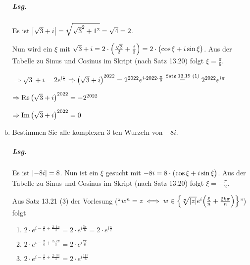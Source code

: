 \documentclass{scrreprt}
\begin{document}
\begin{enumerate}[(a)]
  \subparagraph{Lsg.} Es ist $\abs{\sqrt{3} + i} = \sqrt{\sqrt{3}^2 + 1^2}
  = \sqrt{4} = 2$.

  Nun wird ein $\xi$ mit
  $\sqrt{3} + i = 2 \cdot \qty\Big(\frac{\sqrt{3}}{2} + \frac{i}{2})
  = 2 \cdot \qty\big(\cos \xi + i \sin \xi)$.
  Aus der Tabelle zu Sinus und Cosinus im Skript (nach Satz 13.20) folgt
  $\xi = \frac{\pi}{6}$.

  $\Rightarrow \sqrt{3} + i = 2 e^{i \frac{\pi}{6}}$
  $\Rightarrow \qty\big(\sqrt{3} + i)^{2022}
  = 2^{2022} e^{i \cdot 2022 \cdot \frac{\pi}{6}}
  \overset{\text{Satz 13.19 (1)}}= 2^{2022} e^{i \pi}$


  $\Rightarrow \Re \qty\big(\sqrt{3} + i)^{2022} = - 2^{2022}$

  $\Rightarrow \Im \qty\big(\sqrt{3} + i)^{2022} = 0$

\item Bestimmen Sie alle komplexen 3-ten Wurzeln von $-8i$.

  \subparagraph{Lsg.} Es ist $\abs{-8i} = 8$.
  Nun ist ein $\xi$ gesucht mit $-8i = 8 \cdot \qty\big(\cos \xi + i \sin \xi)$.
  Aus der Tabelle zu Sinus und Cosinus im Skript (nach Satz 13.20) folgt
  $\xi = -\frac{\pi}{2}$.

  Aus Satz 13.21 (3) der Vorlesung (``$w^n = z \iff
  w \in \qty{\sqrt[n]{\abs{z}}e^i\qty(\frac{\xi}{n} + \frac{2k\pi}{n})}$'')
  folgt
  \begin{enumerate}[label={$w_{\arabic*} =$}]
  \item $2 \cdot e^{i -\frac{\pi}{6} + \frac{2 \cdot 1 \pi}{3}} = 2 \cdot e^{i \frac{3\pi}{6}} = 2 \cdot e^{i \frac{\pi}{2}}$ 
  \item $2 \cdot e^{i -\frac{\pi}{6} + \frac{2 \cdot 2 \pi}{3}} = 2 \cdot e^{i \frac{7\pi}{6}}$
  \item $2 \cdot e^{i -\frac{\pi}{6} + \frac{2 \cdot 3 \pi}{3}} = 2 \cdot e^{i \frac{11\pi}{6}}$
  \end{enumerate}
\end{enumerate}
\end{document}
